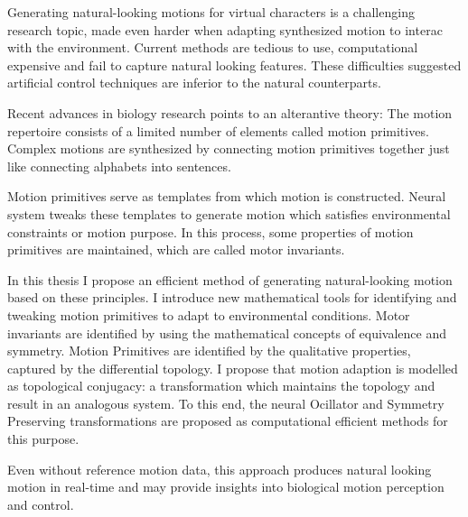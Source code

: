 


\begin{abstracts}        %

Generating natural-looking motions for virtual characters is a challenging research topic, made even harder when adapting synthesized motion to interac with the environment. 
Current methods are tedious to use, computational expensive and fail to capture natural looking features.
These difficulties suggested artificial control techniques are inferior to the natural counterparts.

Recent advances in biology research points to an alterantive theory:
The motion repertoire consists of a limited number of elements called motion primitives. 
Complex motions are synthesized by connecting motion primitives together just like connecting alphabets into sentences.


Motion primitives serve as templates from which motion is constructed.
Neural system tweaks these templates to generate motion which satisfies  environmental constraints or motion purpose.
In this process, some properties of motion primitives are maintained, which are called motor invariants.


In this thesis I propose an efficient method of generating natural-looking motion based on these principles. 
I introduce new mathematical tools for identifying and tweaking motion primitives to adapt to environmental conditions.
Motor invariants are identified by using the mathematical concepts of equivalence and symmetry.
Motion Primitives are identified by the qualitative properties, captured by the differential topology.
I propose that motion adaption is modelled as topological conjugacy: a transformation which maintains the topology and result in an analogous system.
To this end, the neural Ocillator and Symmetry Preserving transformations are proposed as computational efficient methods for this purpose.

Even without reference motion data, this approach produces natural looking motion in real-time and may provide insights into biological motion perception and control.

\end{abstracts}






